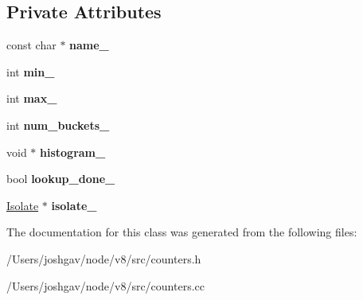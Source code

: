 \subsection*{Private Attributes}
\begin{DoxyCompactItemize}
\item 
const char $\ast$ {\bfseries name\+\_\+}\hypertarget{classv8_1_1internal_1_1_histogram_aa8b33b867f0246617e5eda39613014ee}{}\label{classv8_1_1internal_1_1_histogram_aa8b33b867f0246617e5eda39613014ee}

\item 
int {\bfseries min\+\_\+}\hypertarget{classv8_1_1internal_1_1_histogram_aeeb51be0225edda30de750523fd84ccf}{}\label{classv8_1_1internal_1_1_histogram_aeeb51be0225edda30de750523fd84ccf}

\item 
int {\bfseries max\+\_\+}\hypertarget{classv8_1_1internal_1_1_histogram_a1cd72939839eb345548cde7e78347962}{}\label{classv8_1_1internal_1_1_histogram_a1cd72939839eb345548cde7e78347962}

\item 
int {\bfseries num\+\_\+buckets\+\_\+}\hypertarget{classv8_1_1internal_1_1_histogram_a61360e522801691fa6baff0d69321c16}{}\label{classv8_1_1internal_1_1_histogram_a61360e522801691fa6baff0d69321c16}

\item 
void $\ast$ {\bfseries histogram\+\_\+}\hypertarget{classv8_1_1internal_1_1_histogram_ab667ad67b13ba911390863bc2e2a34ba}{}\label{classv8_1_1internal_1_1_histogram_ab667ad67b13ba911390863bc2e2a34ba}

\item 
bool {\bfseries lookup\+\_\+done\+\_\+}\hypertarget{classv8_1_1internal_1_1_histogram_a40a08a8248d36611f00ecadd00ab5896}{}\label{classv8_1_1internal_1_1_histogram_a40a08a8248d36611f00ecadd00ab5896}

\item 
\hyperlink{classv8_1_1internal_1_1_isolate}{Isolate} $\ast$ {\bfseries isolate\+\_\+}\hypertarget{classv8_1_1internal_1_1_histogram_ac3a29fe8bcc25f86dc432e0364138644}{}\label{classv8_1_1internal_1_1_histogram_ac3a29fe8bcc25f86dc432e0364138644}

\end{DoxyCompactItemize}


The documentation for this class was generated from the following files\+:\begin{DoxyCompactItemize}
\item 
/\+Users/joshgav/node/v8/src/counters.\+h\item 
/\+Users/joshgav/node/v8/src/counters.\+cc\end{DoxyCompactItemize}
